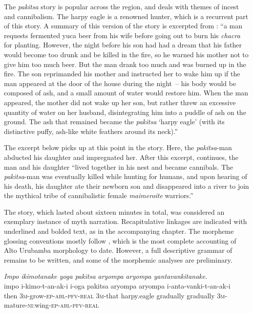 \documentclass[output=paper]{LSP/langsci}
\begin{document}
The \textit{pakitsa} story is popular across the region, and deals with themes of incest and cannibalism. The harpy eagle is a renowned hunter, which is a recurrent part of this story. A summary of this version of the story is excerpted from \citet[][255--256]{emlen14}: ``a man requests fermented yuca beer from his wife before going out to burn his \textit{chacra} for planting. However, the night before his son had had a dream that his father would become too drunk and be killed in the fire, so he warned his mother not to give him too much beer. But the man drank too much and was burned up in the fire. The son reprimanded his mother and instructed her to wake him up if the man appeared at the door of the house during the night~-- his body would be composed of ash, and a small amount of water would restore him. When the man appeared, the mother did not wake up her son, but rather threw an excessive quantity of water on her husband, disintegrating him into a puddle of ash on the ground. The ash that remained became the \textit{pakitsa} `harpy eagle' (with its distinctive puffy, ash-like white feathers around its neck).'' 

The excerpt below picks up at this point in the story. Here, the \textit{pakitsa}-man abducted his daughter and impregnated her. After this excerpt, \citet[][256]{emlen14} continues, the man and his daughter ``lived together in his nest and became cannibals. The \textit{pakitsa}-man was eventually killed while hunting for humans, and upon hearing of his death, his daughter ate their newborn son and disappeared into a river to join the mythical tribe of cannibalistic female \textit{maimeroite} warriors.'' 

The story, which lasted about sixteen minutes in total, was considered an exemplary instance of myth narration. Recapitulative linkages are indicated with underlined and bolded text, as in the accompanying chapter. The morpheme glossing conventions mostly follow \citet{vargas13}, which is the most complete accounting of {Alto Urubamba}  morphology to date. However, a full descriptive grammar of  remains to be written, and some of the morphemic analyses are preliminary.


\begin{exe}
 \label{Emapp01}
\glt \textit{Impo ikimotanake yoga pakitsa aryompa aryompa yantavankitanake.}\\
\gll impo i-kimo-t-an-ak-i i-oga pakitsa aryompa aryompa i-anta-vanki-t-an-ak-i\\
then \textsc{3m-}grow\textsc{-ep-abl-pfv-real} \textsc{3m-}that harpy.eagle gradually gradually \textsc{3m-}mature-\textsc{ni:}wing\textsc{-ep-abl-pfv-real}\\
\glt {}\\
\end{exe}
\end{document}
